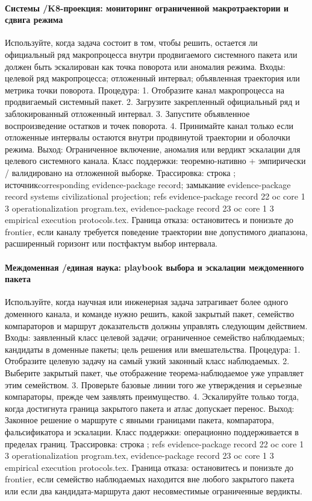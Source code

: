 \paragraph{Системы /\allowbreak K8-проекция: мониторинг ограниченной макротраектории и сдвига режима}
Используйте, когда задача состоит в том, чтобы решить, остается ли официальный ряд макропроцесса внутри продвигаемого системного пакета или должен быть эскалирован как точка поворота или аномалия режима.
Входы: целевой ряд макропроцесса; \allowbreak отложенный интервал; \allowbreak объявленная траектория или метрика точки поворота.
Процедура: 1. Отобразите канал макропроцесса на продвигаемый системный пакет. 2. Загрузите закрепленный официальный ряд и заблокированный отложенный интервал. 3. Запустите объявленное воспроизведение остатков и точек поворота. 4. Принимайте канал только если отложенные интервалы остаются внутри продвинутой траектории и оболочки режима.
Выход: Ограниченное включение, аномалия или вердикт эскалации для целевого системного канала.
Класс поддержки: теоремно-нативно + эмпирически / валидировано на отложенной выборке.
Трассировка: строка ; \allowbreak источникcorresponding evidence-package record; \allowbreak замыкание evidence-package record systems civilizational projection; \allowbreak refs evidence-package record 22 oc core 1 3 operationalization program.tex, \allowbreak evidence-package record 23 oc core 1 3 empirical execution protocols.tex.
Граница отказа: остановитесь и понизьте до frontier, если каналу требуется поведение траектории вне допустимого диапазона, расширенный горизонт или постфактум выбор интервала.

\paragraph{Междоменная /\allowbreak единая наука: playbook выбора и эскалации междоменного пакета}
Используйте, когда научная или инженерная задача затрагивает более одного доменного канала, и команде нужно решить, какой закрытый пакет, семейство компараторов и маршрут доказательств должны управлять следующим действием.
Входы: заявленный класс целевой задачи; \allowbreak ограниченное семейство наблюдаемых; \allowbreak кандидаты в доменные пакеты; \allowbreak цель решения или вмешательства.
Процедура: 1. Отобразите целевую задачу на самый узкий законный класс наблюдаемых. 2. Выберите закрытый пакет, чье отображение теорема-наблюдаемое уже управляет этим семейством. 3. Проверьте базовые линии того же утверждения и серьезные компараторы, прежде чем заявлять преимущество. 4. Эскалируйте только тогда, когда достигнута граница закрытого пакета и атлас допускает перенос.
Выход: Законное решение о маршруте с явными границами пакета, компаратора, фальсификатора и эскалации.
Класс поддержки: операционно поддерживается в пределах границ.
Трассировка: строка ; \allowbreak refs evidence-package record 22 oc core 1 3 operationalization program.tex, \allowbreak evidence-package record 23 oc core 1 3 empirical execution protocols.tex.
Граница отказа: остановитесь и понизьте до frontier, если семейство наблюдаемых находится вне любого закрытого пакета или если два кандидата-маршрута дают несовместимые ограниченные вердикты.

